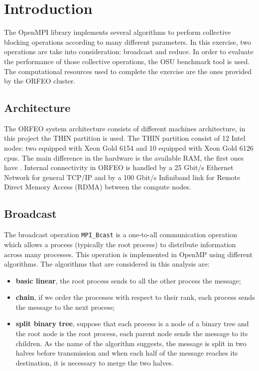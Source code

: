 \section{Introduction}

The OpenMPI library implements several algorithms to perform collective blocking operations according to many different parameters. In this exercise, two operations are take into consideration: broadcast and reduce. In order to evaluate the performance of those collective operations, the OSU benchmark tool is used. The computational resources used to complete the exercise are the ones provided by the ORFEO cluster.

\subsection{Architecture}

The ORFEO system architecture consists of different machines architecture, in this project the THIN partition is used. The THIN partition consist of 12 Intel nodes:  two equipped with Xeon Gold 6154 and 10 equipped with Xeon Gold 6126 cpus. The main difference in the hardware is the available RAM, the first ones have . Internal connectivity in ORFEO is handled by a 25 Gbit/s Ethernet Network for general TCP/IP and by a 100 Gbit/s Infiniband link for Remote Direct Memory Access (RDMA) between the compute nodes.

\subsection{Broadcast}

The broadcast operation \texttt{MPI\_Bcast} is a one-to-all communication operation which allows a process (typically the root process) to distribute information across many processes. This operation is implemented in OpenMP using different algorithms. The algorithms that are considered in this analysis are:
\begin{itemize}
\item \textbf{basic linear}, the root process sends to all the other process the message;
\item \textbf{chain}, if we order the processes with respect to their rank, each process sends the message to the next process;
\item \textbf{split binary tree}, suppose that each process is a node of a binary tree and the root node is the root process, each parent node sends the message to its children. As the name of the algorithm suggests, the message is split in two halves before transmission and when each half of the message reaches its destination, it is necessary to merge the two halves.
\end{itemize}


